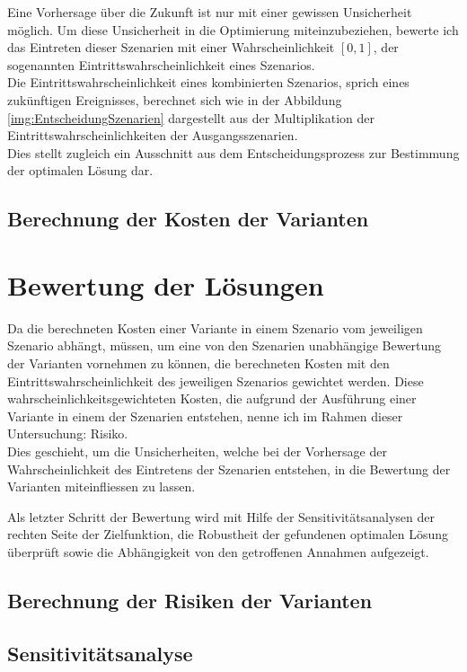 Eine Vorhersage über die Zukunft ist nur mit einer gewissen Unsicherheit möglich. Um diese Unsicherheit in die Optimierung miteinzubeziehen, bewerte ich das Eintreten dieser Szenarien mit einer Wahrscheinlichkeit $[0,1]$, der sogenannten Eintrittswahrscheinlichkeit eines Szenarios.  \\
Die Eintrittswahrscheinlichkeit eines kombinierten Szenarios, sprich eines zukünftigen Ereignisses, berechnet sich wie in der Abbildung \ref{img:EntscheidungSzenarien} dargestellt aus der Multiplikation der Eintrittswahrscheinlichkeiten der Ausgangsszenarien. \\
Dies stellt zugleich ein Ausschnitt aus dem Entscheidungsprozess zur Bestimmung der optimalen Lösung dar.
 
 

	


	\subsection{Berechnung der Kosten der Varianten}
	\label{subsec:Kostenberechnung}
	


\section{Bewertung der Lösungen}
\label{sec:Bewertung}

Da die berechneten Kosten einer Variante in einem Szenario vom jeweiligen Szenario abhängt, müssen, um eine von den Szenarien unabhängige Bewertung der Varianten vornehmen zu können, die berechneten Kosten mit den Eintrittswahrscheinlichkeit des jeweiligen Szenarios gewichtet werden. Diese wahrscheinlichkeitsgewichteten Kosten, die aufgrund der Ausführung einer Variante in einem der Szenarien entstehen, nenne ich im Rahmen dieser Untersuchung: Risiko. \\
Dies geschieht, um die Unsicherheiten, welche bei der Vorhersage der Wahrscheinlichkeit des Eintretens der Szenarien entstehen, in die Bewertung der Varianten miteinfliessen zu lassen. 

Als letzter Schritt der Bewertung wird mit Hilfe der Sensitivitätsanalysen der rechten Seite der Zielfunktion, die Robustheit der gefundenen optimalen Lösung überprüft sowie die Abhängigkeit von den getroffenen Annahmen aufgezeigt.


	\subsection{Berechnung der Risiken der Varianten}
	



	\subsection{Sensitivitätsanalyse}
	

%

